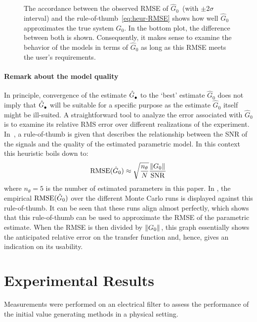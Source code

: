 \begin{figure}
  \centering
  \setlength{\figurewidth}{0.66\onecolumnwidth}
  \setlength{\figureheight}{0.68\figurewidth}
  
 \caption[Simulated model \gls{RMSE} compared to rule-of-thumb.]{The accordance between the observed \gls{RMSE} of $\hat{G}_0$~(with $\pm2\sigma$ interval) and the rule-of-thumb~\eqref{eq:heur-RMSE} shows how well $\hat{G}_0$ approximates the true system $G_0$.
 In the bottom plot, the difference between both is shown.
 Consequently, it makes sense to examine the behavior of the models in terms of $\hat{G}_0$ as long as this RMSE meets the user's requirements.}
  \label{fig:RMSE}
\end{figure}

\paragraph*{Remark about the model quality}
In principle, convergence of the estimate $\hat{G}_{\mathrm{\bullet}}^{\mathrm{}}$ to the `best' estimate $\hat{G}_{0}$ does not imply that $\hat{G}_{\mathrm{\bullet}}^{\mathrm{}}$ will be suitable for a specific purpose as the estimate $\hat{G}_{0}$ itself might be ill-suited.
A straightforward tool to analyze the error associated with $\hat{G}_0$ is to examine its relative RMS error over different realizations of the experiment.
In~\citep{Ljung1999}, a rule-of-thumb is given that describes the relationship between the SNR of the signals and the quality of the estimated parametric model.
In this context this heuristic boils down to: 
\begin{equation}
    \mathrm{RMSE}(\hat{G}_{0}) \approx \sqrt{\frac{n_\theta}{N}} \frac{\left\| G_0 \right\|_{}}{\mathrm{SNR}} 
    \label{eq:heur-RMSE}
\end{equation}
where $n_{\theta}=5$ is the number of estimated parameters in this paper.
In , the empirical $\mathrm{RMSE}(\hat{G}_{0})$ over the different Monte Carlo runs is displayed against this rule-of-thumb.
It can be seen that these runs align almost perfectly, which shows that this rule-of-thumb can be used to approximate the RMSE of the parametric estimate.
When the RMSE is then divided by $\left\| G_0 \right\|_{}$, this graph essentially shows the anticipated relative error on the transfer function and, hence, gives an indication on its usability.

\section{Experimental Results}
\label{se:ExpMeas}
Measurements were performed on an electrical filter to assess the performance of the initial value generating methods in a physical setting.

